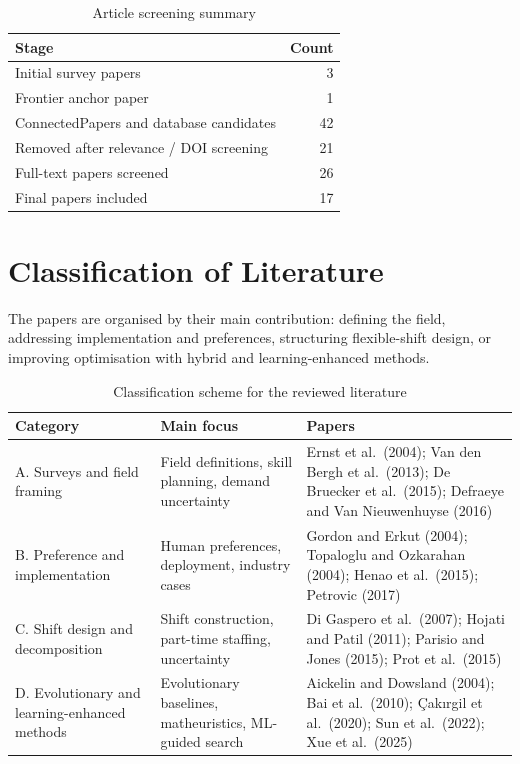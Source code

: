\documentclass[12pt]{article}
\begin{document}
\begin{table}[H]
\centering
\caption{Article screening summary}
\label{tab:screening}
\begin{tabular}{lr}
\toprule
Stage & Count \\
\midrule
Initial survey papers & 3 \\
Frontier anchor paper & 1 \\
ConnectedPapers and database candidates & 42 \\
Removed after relevance / DOI screening & 21 \\
Full-text papers screened & 26 \\
Final papers included & 17 \\
\bottomrule
\end{tabular}
\end{table}

\section{Classification of Literature}

The papers are organised by their main contribution: defining the field, addressing implementation and preferences, structuring flexible-shift design, or improving optimisation with hybrid and learning-enhanced methods.

\begin{table}[H]
\centering
\caption{Classification scheme for the reviewed literature}
\label{tab:classification}
\small
\begin{tabularx}{\textwidth}{p{}p{}Y}
\toprule
Category & Main focus & Papers \\
\midrule
A. Surveys and field framing & Field definitions, skill planning, demand uncertainty & Ernst et al.\ (2004); Van den Bergh et al.\ (2013); De Bruecker et al.\ (2015); Defraeye and Van Nieuwenhuyse (2016) \\
B. Preference and implementation & Human preferences, deployment, industry cases & Gordon and Erkut (2004); Topaloglu and Ozkarahan (2004); Henao et al.\ (2015); Petrovic (2017) \\
C. Shift design and decomposition & Shift construction, part-time staffing, uncertainty & Di Gaspero et al.\ (2007); Hojati and Patil (2011); Parisio and Jones (2015); Prot et al.\ (2015) \\
D. Evolutionary and learning-enhanced methods & Evolutionary baselines, matheuristics, ML-guided search & Aickelin and Dowsland (2004); Bai et al.\ (2010); \c{C}ak{\i}rgil et al.\ (2020); Sun et al.\ (2022); Xue et al.\ (2025) \\
\bottomrule
\end{tabularx}
\end{table}
\end{document}
